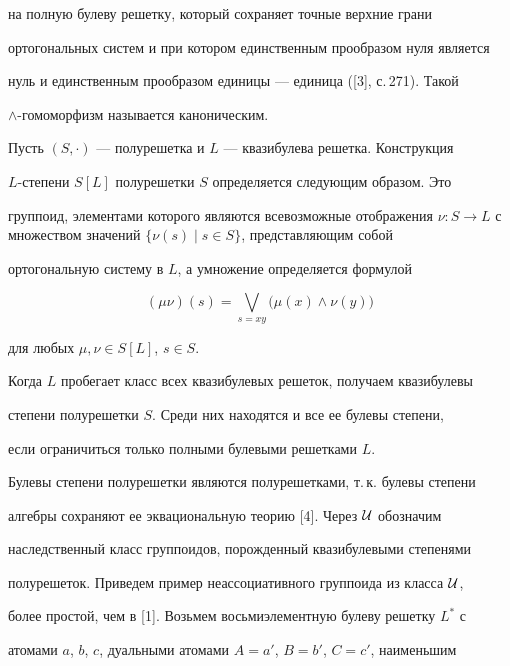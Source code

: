 на полную булеву решетку, который сохраняет точные верхние грани


ортогональных систем и при котором единственным прообразом нуля является


нуль и единственным прообразом единицы --- единица ([3], с.\,271). Такой


$\wedge$-гомоморфизм называется каноническим.





Пусть $(S,\cdot)$ --- полурешетка и $L$ --- квазибулева решетка. Конструкция


$L$-степени $S[L]$ полурешетки $S$ определяется следующим образом. Это


группоид, элементами которого являются всевозможные отображения $\nu :S\to


L$ с множеством значений $\{\nu(s)\mid s\in S\}$, представляющим собой


ортогональную систему в $L$, а умножение определяется формулой


\begin{equation}


(\mu\nu)(s)=\bigvee_{s=xy}\big(\mu(x)\wedge\nu(y)\big)


\end{equation}


для любых $\mu,\nu\in S[L]$, $s\in S$.





Когда $L$ пробегает класс всех квазибулевых решеток, получаем квазибулевы


степени полурешетки $S$. Среди них находятся и все ее булевы степени,


если ограничиться только полными булевыми решетками $L$.





Булевы степени полурешетки являются полурешетками, т.\,к. булевы степени


алгебры сохраняют ее эквациональную теорию [4]. Через $\cal U$ обозначим


наследственный класс группоидов, порожденный квазибулевыми степенями


полурешеток. Приведем пример неассоциативного группоида из класса $\cal U$,


более простой, чем в [1]. Возьмем восьмиэлементную булеву решетку $L^*$ с


атомами $a$, $b$, $c$, дуальными атомами $A=a'$, $B=b'$, $C=c'$, наименьшим


